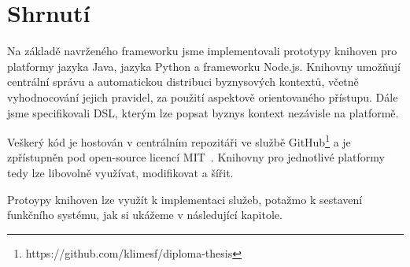 \section{Shrnutí}

Na základě navrženého frameworku jsme implementovali prototypy
knihoven pro platformy jazyka Java, jazyka Python a frameworku
Node.js. Knihovny umožňují centrální správu a automatickou distribuci
byznysových kontextů, včetně vyhodnocování jejich pravidel, za
použití aspektově orientovaného přístupu.
Dále jsme specifikovali \gls{DSL}, kterým lze popsat byznys kontext
nezávisle na platformě.

Veškerý kód je hostován v centrálním repozitáři
ve službě GitHub\footnote{
https://github.com/klimesf/diploma-thesis
} a je zpřístupněn pod open-source licencí MIT~\cite{mitlicense}.
Knihovny pro jednotlivé platformy tedy lze libovolně
využívat, modifikovat a šířit.

Protoypy knihoven lze využít k implementaci služeb,
potažmo k sestavení funkčního systému, jak si ukážeme
v následující kapitole.
